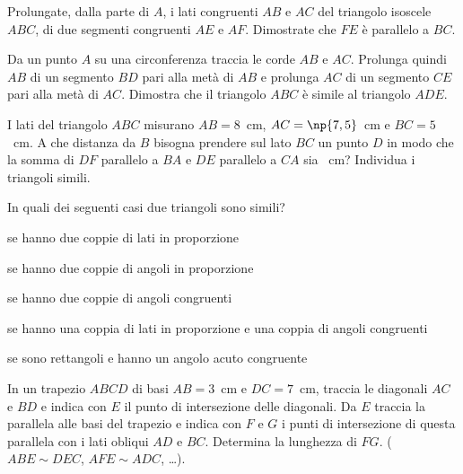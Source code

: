 \begin{multicols}{2}
\begin{esercizio}
\label{ese:6.77}
Prolungate, dalla parte di \(A\), i lati congruenti \(AB\) e \(AC\) del 
triangolo isoscele \(ABC\), di due segmenti congruenti \(AE\) e \(AF\). 
Dimostrate che \(FE\) è parallelo a \(BC\).
\end{esercizio}

\begin{esercizio}
\label{ese:6.78}
Da un punto \(A\) su una circonferenza traccia le corde \(AB\) e \(AC\). 
Prolunga quindi \(AB\) di un segmento \(BD\) pari alla metà di \(AB\) e 
prolunga \(AC\) di un segmento \(CE\) pari alla metà di \(AC\). Dimostra 
che il triangolo \(ABC\) è simile al triangolo \(ADE\).
\end{esercizio}

\begin{esercizio}
\label{ese:6.79}
I lati del triangolo \(ABC\) misurano \(AB=8\)~cm, \(AC=\np{7,5}\)~cm e 
\(BC=5\)~cm. A che distanza da \(B\) bisogna prendere sul lato \(BC\) un 
punto \(D\) in modo che la somma di \(DF\) parallelo a \(BA\) e \(DE\) 
parallelo a \(CA\) sia ~cm? Individua i triangoli simili.
\end{esercizio}

\begin{esercizio}
\label{ese:6.80}
In quali dei seguenti casi due triangoli sono simili?
\begin{enumeratea}
\item se hanno due coppie di lati in 
proporzione\tab\hfill\boxV\quad\boxF
\item se hanno due coppie di angoli in 
proporzione\tab\hfill\boxV\quad\boxF
\item se hanno due coppie di angoli 
congruenti\tab\hfill\boxV\quad\boxF
\item se hanno una coppia di lati in proporzione e una coppia di 
angoli congruenti\tab\hfill\boxV\quad\boxF
\item se sono rettangoli e hanno un angolo acuto 
congruente\hfill\boxV\quad\boxF
\end{enumeratea}
\end{esercizio}

\begin{esercizio}
\label{ese:6.81}
In un trapezio \(ABCD\) di basi \(AB=3\)~cm e \(DC=7\)~cm, traccia le 
diagonali \(AC\) e \(BD\) e indica con \(E\) il punto di intersezione delle 
diagonali. Da \(E\) traccia la parallela alle basi del trapezio e 
indica con \(F\) e \(G\) i punti di intersezione di questa parallela con i 
lati obliqui \(AD\) e \(BC\). Determina la lunghezza di \(FG\). (\(ABE\sim 
DEC\), \(AFE\sim ADC\), \ldots).
\end{esercizio}


\end{multicols}
